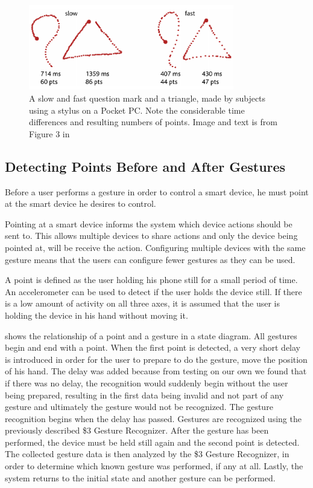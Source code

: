 \begin{figure}[!htb]
  \centering
  \includegraphics[width=0.8\textwidth]{images/1-dollar-gesturetrace.png}
  \caption{A slow and fast question mark and a triangle, made by subjects using a stylus on a Pocket PC. Note the considerable time differences and resulting numbers of points. Image and text is from Figure 3 in \cite{wobbrock2007gestures}}
  \label{fig:onedollar-gesturetrace}
\end{figure}

\subsection{Detecting Points Before and After Gestures}
\label{sec:gesture-recognition:points}
Before a user performs a gesture in order to control a smart device, 
he must point at the smart device he desires to control. 

Pointing at a smart device informs the system which device actions should be sent to. This allows multiple devices to share actions and only the device being pointed at, will be receive the action. Configuring multiple devices with the same gesture means that the users can configure fewer gestures as they can be used.

A point is defined as the user holding his phone still for a small period of time. 
An accelerometer can be used to detect if the user holds the device still. 
If there is a low amount of activity on all three axes, 
it is assumed that the user is holding the device in his hand without moving it.

 shows the relationship of a point and a gesture in a state diagram. 
All gestures begin and end with a point. 
When the first point is detected, 
a very short delay is introduced in order for the user to prepare to do the gesture, 
\eg move the position of his hand. 
The delay was added because from testing on our own we found that if there was no delay, the recognition would suddenly begin without the user being prepared, resulting in the first data being invalid and not part of any gesture and ultimately the gesture would not be recognized.
The gesture recognition begins when the delay has passed. 
Gestures are recognized using the previously described \$3 Gesture Recognizer. 
After the gesture has been performed, 
the device must be held still again and the second point is detected. 
The collected gesture data is then analyzed by the \$3 Gesture Recognizer, 
in order to determine which known gesture was performed, if any at all. 
Lastly, the system returns to the initial state and another gesture can be performed.

